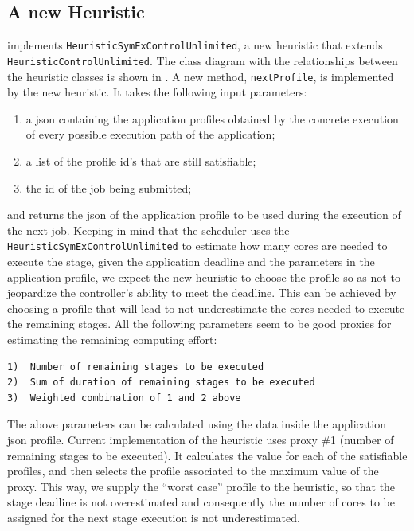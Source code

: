 \subsection{A new Heuristic}\label{sec:new_heuristic}
\tool implements \texttt{HeuristicSymExControlUnlimited}, a 
new heuristic that extends \texttt{HeuristicControlUnlimited}. 
The class diagram with the relationships between the heuristic classes is shown in . A new method, \texttt{nextProfile}, is implemented by the new heuristic. It takes the following input parameters:
\begin{enumerate}[$1) $] 
	\item a json containing the application profiles obtained by the concrete execution of every possible execution path of the application;
	\item a list of the profile id’s that are still satisfiable;
	\item the id of the job being submitted;
\end{enumerate}
and returns the json of the application profile to be used during the execution of the next job.
Keeping in mind that the scheduler uses the \texttt{HeuristicSymExControlUnlimited} to estimate how many cores are needed to execute the stage, given the application deadline and the parameters in the application profile, we expect the new heuristic to choose the profile so as not to jeopardize the controller's ability to meet the deadline. This can be achieved by choosing a profile that will lead to not underestimate the cores needed to execute the remaining stages. All the following parameters seem to be good proxies for estimating the remaining computing effort:
\begin{verbatim}
1)	Number of remaining stages to be executed
2)	Sum of duration of remaining stages to be executed
3)	Weighted combination of 1 and 2 above
\end{verbatim}
The above parameters can be calculated using the data inside the application json profile. 
Current implementation of the heuristic uses proxy \#1 (number of remaining stages to be executed). It calculates the value for each of the satisfiable profiles, and then selects the profile associated to the maximum value of the proxy. This way, we supply the “worst case” profile to the heuristic, so that the stage deadline is not overestimated and consequently the number of cores to be assigned for the next stage execution is not underestimated.

